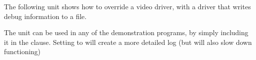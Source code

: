 The following unit shows how to override a video driver, with a driver
that writes debug information to a file.


The unit can be used in any of the demonstration programs, by simply
including it in the  clause. Setting  to
 will create a more detailed log (but will also slow down
functioning)